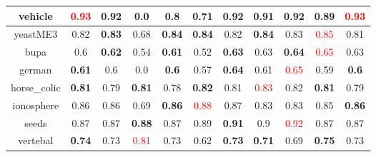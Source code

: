 \documentclass{article}%
\begin{document}
\begin{tabular}{c|cccccccccc}
\hline%
vehicle&\textcolor{red}{ 
0.93
}&0.92&0.0&\textbf{0.8}&0.71&\textbf{0.92}&0.91&\textbf{0.92}&0.89&\textcolor{red}{ 
0.93
}\\%
\hline%
yeastME3&0.82&\textbf{0.83}&0.68&\textbf{0.84}&\textbf{0.84}&0.82&\textbf{0.84}&0.83&\textcolor{red}{ 
0.85
}&0.81\\%
\hline%
bupa&0.6&\textbf{0.62}&0.54&\textbf{0.61}&0.52&\textbf{0.63}&0.63&\textbf{0.64}&\textcolor{red}{ 
0.65
}&0.63\\%
\hline%
german&\textbf{0.61}&0.6&0.0&\textbf{0.6}&0.57&\textbf{0.64}&0.61&\textcolor{red}{ 
0.65
}&0.59&\textbf{0.6}\\%
\hline%
horse\_colic&\textbf{0.81}&0.79&\textbf{0.81}&0.78&\textbf{0.82}&0.81&\textcolor{red}{ 
0.83
}&0.82&\textbf{0.81}&0.79\\%
\hline%
ionosphere&0.86&0.86&0.69&\textbf{0.86}&\textcolor{red}{ 
0.88
}&0.87&0.83&0.83&0.85&\textbf{0.86}\\%
\hline%
seeds&0.87&0.87&\textbf{0.88}&0.87&0.89&\textbf{0.91}&0.9&\textcolor{red}{ 
0.92
}&0.87&0.87\\%
\hline%
vertebal&\textbf{0.74}&0.73&\textcolor{red}{ 
0.81
}&0.73&0.62&\textbf{0.73}&\textbf{0.71}&0.69&\textbf{0.75}&0.73\\%
\hline%
\end{tabular}

%
\end{document}
